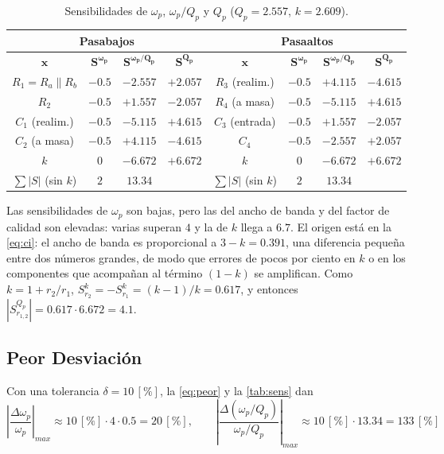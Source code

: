 \begin{table}[H]
    \centering
    \caption{Sensibilidades de $\omega_p$, $\omega_p/Q_p$ y $Q_p$ ($Q_p = 2.557$, $k = 2.609$).}
    \label{tab:sens}
    \begin{tabular}{|c|c|c|c||c|c|c|c|}
        \hline
        \multicolumn{4}{|c||}{\textbf{Pasabajos}} & \multicolumn{4}{c|}{\textbf{Pasaaltos}} \\
        \hline
        $\boldsymbol{x}$ & $\boldsymbol{S^{\omega_p}}$ & $\boldsymbol{S^{\omega_p/Q_p}}$ & $\boldsymbol{S^{Q_p}}$ &
        $\boldsymbol{x}$ & $\boldsymbol{S^{\omega_p}}$ & $\boldsymbol{S^{\omega_p/Q_p}}$ & $\boldsymbol{S^{Q_p}}$ \\
        \hline
        $R_1 = R_a \parallel R_b$ & $-0.5$ & $-2.557$ & $+2.057$ & $R_3$ (realim.) & $-0.5$ & $+4.115$ & $-4.615$ \\
        $R_2$ & $-0.5$ & $+1.557$ & $-2.057$ & $R_4$ (a masa) & $-0.5$ & $-5.115$ & $+4.615$ \\
        $C_1$ (realim.) & $-0.5$ & $-5.115$ & $+4.615$ & $C_3$ (entrada) & $-0.5$ & $+1.557$ & $-2.057$ \\
        $C_2$ (a masa) & $-0.5$ & $+4.115$ & $-4.615$ & $C_4$ & $-0.5$ & $-2.557$ & $+2.057$ \\
        $k$ & $0$ & $-6.672$ & $+6.672$ & $k$ & $0$ & $-6.672$ & $+6.672$ \\
        \hline
        $\sum |S|$ (sin $k$) & $2$ & $13.34$ & & $\sum |S|$ (sin $k$) & $2$ & $13.34$ & \\
        \hline
    \end{tabular}
\end{table}

Las sensibilidades de $\omega_p$ son bajas, pero las del ancho de banda y del factor de calidad son elevadas: varias superan $4$ y la de $k$ llega a $6.7$. El origen está en la \autoref{eq:ci}: el ancho de banda es proporcional a $3 - k = 0.391$, una diferencia pequeña entre dos números grandes, de modo que errores de pocos por ciento en $k$ o en los componentes que acompañan al término $(1-k)$ se amplifican. Como $k = 1 + r_2/r_1$, $S_{r_2}^{k} = -S_{r_1}^{k} = (k-1)/k = 0.617$, y entonces $|S_{r_{1,2}}^{Q_p}| = 0.617 \cdot 6.672 = 4.1$.

\subsection{Peor Desviación}
\label{sec_3.5}
Con una tolerancia $\delta = 10 \, [\%]$, la \autoref{eq:peor} y la \autoref{tab:sens} dan
\begin{equation}
    \left|\frac{\Delta \omega_p}{\omega_p}\right|_{max} \approx 10 \, [\%] \cdot 4 \cdot 0.5 = 20 \, [\%],
    \qquad
    \left|\frac{\Delta (\omega_p/Q_p)}{\omega_p/Q_p}\right|_{max} \approx 10 \, [\%] \cdot 13.34 = 133 \, [\%]
\end{equation}

